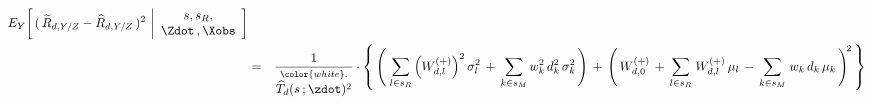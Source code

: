 \begin{lemma}
\begin{enumerate}
\begin{eqnarray*}
        E_{Y}\!\left[\,
            (\,\widetilde{R}_{d,Y/Z} - \widehat{R}_{d,Y/Z}\,)^{2}
            \,\left\vert
            \begin{array}{c}
                s,s_{R},
                \\
                \Zdot\,,\Xobs
                \end{array}
            \right.
            \!\right]
    \\
    & = &
        \dfrac{
            1}{
            \overset{{\color{white}.}}{
                \widehat{T}_{d}(s\,;\zdot)^{2}
                }
            }
        \cdot
        \left\{\,
            \left(\;
                \underset{l \in s_{R}}{\sum}
                    \left(W^{(+)}_{d,l}\right)^{2}\sigma_{l}^{2}
                \,+\,
                \underset{k \in s_{M}}{\sum}\,
                    w_{k}^{2}\,d_{k}^{2}\,\sigma_{k}^{2}
                \,\right)
            \, + \,
            \left(\,
                W^{(+)}_{d,0}
                \,+\,
                \underset{l \in s_{R}}{\sum}\;W^{(+)}_{d,l}\,\mu_{l}
                \,-\,
                \underset{k \in s_{M}}{\sum}\;w_{k}\,d_{k}\,\mu_{k}
                \,\right)^{\!2}
            \,\right\}
    \end{eqnarray*}
\end{enumerate}
\end{lemma}
\proof
